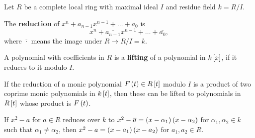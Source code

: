 Let $ R $ be a complete local ring with maximal ideal $ I $ and residue field $ k = R / I $.

\begin{definition}
The \textbf{reduction} of $ x^n + a_{n - 1}x^{n - 1} + \dots + a_0 $ is
$$ x^n + \overline{a_{n - 1}}x^{n - 1} + \dots + \overline{a_0}, $$
where $ \overline{\cdot} $ means the image under $ R \to R / I = k $.
\end{definition}

\begin{definition}
A polynomial with coefficients in $ R $ is a \textbf{lifting} of a polynomial in $ k\sbr{x} $, if it reduces to it modulo $ I $.
\end{definition}

\begin{theorem}
If the reduction of a monic polynomial $ F\br{t} \in R\sbr{t} $ modulo $ I $ is a product of two coprime monic polynomials in $ k\sbr{t} $, then these can be lifted to polynomials in $ R\sbr{t} $ whose product is $ F\br{t} $.
\end{theorem}

\begin{example}
If $ x^2 - a $ for $ a \in R $ reduces over $ k $ to $ x^2 - \overline{a} = \br{x - \alpha_1}\br{x - \alpha_2} $ for $ \alpha_1, \alpha_2 \in k $ such that $ \alpha_1 \ne \alpha_2 $, then $ x^2 - a = \br{x - a_1}\br{x - a_2} $ for $ a_1, a_2 \in R $.
\end{example}

